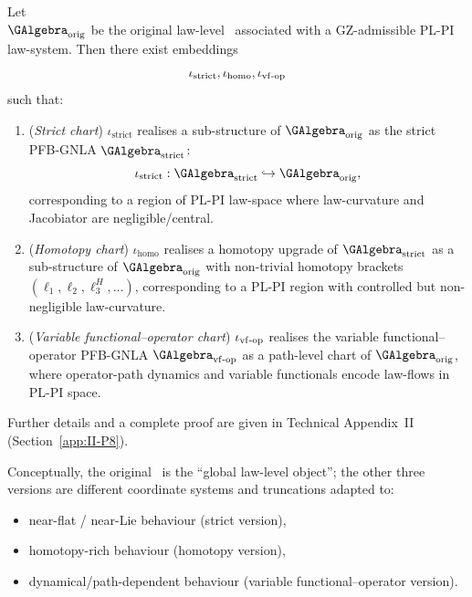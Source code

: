 \documentclass[11pt]{book}
\theoremstyle{plain}
\theoremstyle{definition}
\begin{document}
\begin{proposition}
Let \\ $\GAlgebra_{\mathrm{orig}}$ be the original law-level \GAlgebra\
  associated with a GZ-admissible PL-PI law-system. Then there exist
  embeddings
  \[
    \iota_{\mathrm{strict}},
    \iota_{\mathrm{homo}},
    \iota_{\mathrm{vf\text- op}}
  \]
  such that:
  \begin{enumerate}[label=\roman*)]
    \item (\emph{Strict chart})
          $\iota_{\mathrm{strict}}$ realises a sub-structure of
          $\GAlgebra_{\mathrm{orig}}$ as the strict PFB-GNLA
          $\GAlgebra_{\mathrm{strict}}$:
          \[
            \iota_{\mathrm{strict}}:
               \GAlgebra_{\mathrm{strict}}
               \hookrightarrow
               \GAlgebra_{\mathrm{orig}},
          \]
          corresponding to a region of PL-PI law-space where
          law-curvature and Jacobiator are negligible/central.
    \item (\emph{Homotopy chart})
          $\iota_{\mathrm{homo}}$ realises a homotopy upgrade of
          $\GAlgebra_{\mathrm{strict}}$ as a sub-structure of
          $\GAlgebra_{\mathrm{orig}}$ with non-trivial homotopy
          brackets $(\ell_1,\ell_2,\ell_3^H,\dots)$, corresponding to
          a PL-PI region with controlled but non-negligible
          law-curvature.
    \item (\emph{Variable functional--operator chart})
          $\iota_{\mathrm{vf\text- op}}$ realises the variable
          functional--operator PFB-GNLA
          $\GAlgebra_{\mathrm{vf\text- op}}$ as a path-level chart of
          $\GAlgebra_{\mathrm{orig}}$, where operator-path dynamics
          and variable functionals encode law-flows in PL-PI space.
  \end{enumerate}
  Further details and a complete proof are given in Technical Appendix~II
  (Section~\ref{app:II-P8}).
\end{proposition}

Conceptually, the original \GAlgebra\ is the “global law-level object”;
the other three versions are different coordinate systems and
truncations adapted to:

\begin{itemize}
  \item near-flat / near-Lie behaviour (strict version),
  \item homotopy-rich behaviour (homotopy version),
  \item dynamical/path-dependent behaviour (variable functional--operator
        version).
\end{itemize}
\end{document}
